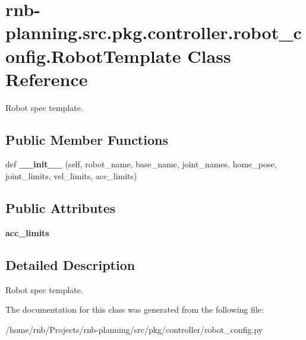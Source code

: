 \hypertarget{classrnb-planning_1_1src_1_1pkg_1_1controller_1_1robot__config_1_1_robot_template}{}\section{rnb-\/planning.src.\+pkg.\+controller.\+robot\+\_\+config.\+Robot\+Template Class Reference}
\label{classrnb-planning_1_1src_1_1pkg_1_1controller_1_1robot__config_1_1_robot_template}


Robot spec template.  


\subsection*{Public Member Functions}
\begin{DoxyCompactItemize}
\item 
\mbox{\label{classrnb-planning_1_1src_1_1pkg_1_1controller_1_1robot__config_1_1_robot_template_af988e39e9e699718b6735f1b2445ed6d}} 
def {\bfseries \+\_\+\+\_\+init\+\_\+\+\_\+} (self, robot\+\_\+name, base\+\_\+name, joint\+\_\+names, home\+\_\+pose, joint\+\_\+limits, vel\+\_\+limits, acc\+\_\+limits)
\end{DoxyCompactItemize}
\subsection*{Public Attributes}
\begin{DoxyCompactItemize}
\item 
\mbox{\label{classrnb-planning_1_1src_1_1pkg_1_1controller_1_1robot__config_1_1_robot_template_aff45ea01ef0abfd823fd1fadb61954fb}} 
{\bfseries acc\+\_\+limits}
\end{DoxyCompactItemize}


\subsection{Detailed Description}
Robot spec template. 

The documentation for this class was generated from the following file\+:\begin{DoxyCompactItemize}
\item 
/home/rnb/\+Projects/rnb-\/planning/src/pkg/controller/robot\+\_\+config.\+py\end{DoxyCompactItemize}
